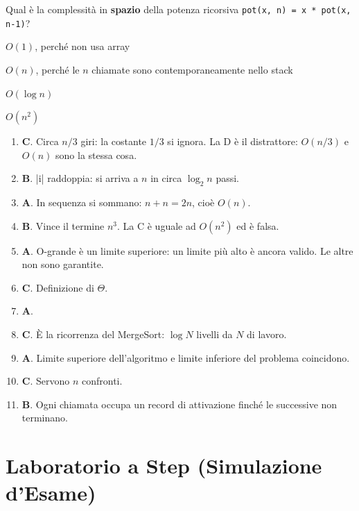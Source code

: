 \begin{quiz}{Qual è la complessità in \textbf{spazio} della potenza ricorsiva \texttt{pot(x, n) = x * pot(x, n-1)}?}
  \item $O(1)$, perché non usa array
  \item $O(n)$, perché le $n$ chiamate sono contemporaneamente nello stack
  \item $O(\log n)$
  \item $O(n^2)$
\end{quiz}

\begin{soluzione}
\begin{enumerate}[label=\textbf{\arabic*.}]
  \item \textbf{C}. Circa $n/3$ giri: la costante $1/3$ si ignora. La D è il
        distrattore: $O(n/3)$ e $O(n)$ sono la stessa cosa.
  \item \textbf{B}. \cc|i| raddoppia: si arriva a $n$ in circa $\log_2 n$ passi.
  \item \textbf{A}. In sequenza si sommano: $n + n = 2n$, cioè $O(n)$.
  \item \textbf{B}. Vince il termine $n^3$. La C è uguale ad $O(n^2)$ ed è falsa.
  \item \textbf{A}. O-grande è un limite superiore: un limite più alto è ancora
        valido. Le altre non sono garantite.
  \item \textbf{C}. Definizione di $\Theta$.
  \item \textbf{A}.
  \item \textbf{C}. È la ricorrenza del MergeSort: $\log N$ livelli da $N$ di lavoro.
  \item \textbf{A}. Limite superiore dell'algoritmo e limite inferiore del problema
        coincidono.
  \item \textbf{C}. Servono $n$ confronti.
  \item \textbf{B}. Ogni chiamata occupa un record di attivazione finché le
        successive non terminano.
\end{enumerate}
\end{soluzione}

\section{Laboratorio a Step (Simulazione d'Esame)}

